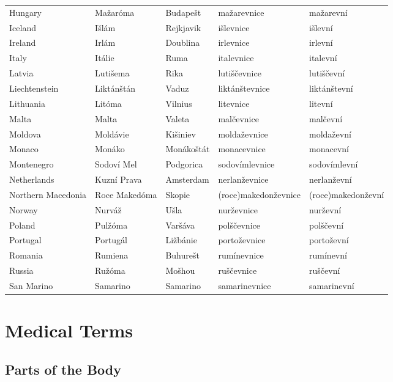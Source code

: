 {\begin{longtabu} {ZZZZZ}
    Hungary             & Mažaróma    & Budapešt  & mažarevnice   & mažarevní\\
    Iceland             & Išlám   & Rejkjavik     & išlevnice & išlevní\\
    Ireland             & Irlám       & Doublina      & irlevnice     & irlevní\\
    Italy               & Itálie      & Ruma          & italevnice    & italevní\\
    Latvia              & Lutišema  & Rika          & lutiščevnice  & lutiščevní\\
    Liechtenstein       & Liktánštán & Vaduz    & liktánštevnice & liktánštevní\\
    Lithuania           & Litóma      & Vilnius       & litevnice     & litevní\\
    Malta               & Malta         & Valeta        & malčevnice    & malčevní\\
    Moldova             & Moldávie    & Kišiniev  & moldaževnice  & moldaževní\\
    Monaco              & Monáko      & Monákoštát    & monacevnice   & monacevní\\
    Montenegro          & Sodoví Mel  & Podgorica     & sodovímlevnice  & sodovímlevní\\
    Netherlands         & Kuzní Prava & Amsterdam     & nerlanževnice & nerlanževní\\
    Northern Macedonia  & Roce Makedóma   & Skopie    & (roce)makedonževnice & (roce)makedonževní\\
    Norway              & Nurváž  & Ušla      & nurževnice    & nurževní\\
    Poland              & Pulžóma & Varšáva & polščevnice   & polščevní\\
    Portugal            & Portugál    & Ližbánie    & portoževnice  & portoževní\\
    Romania             & Rumiena       & Buhurešt  & rumínevnice & rumínevní\\
    Russia              & Ružóma  & Mošhou    & ruščevnice & ruščevní\\
    San Marino          & Samarino      & Samarino      & samarinevnice & samarinevní\\
\bottomrule
\end{longtabu}}

\section{Medical Terms}
\subsection{Parts of the Body}